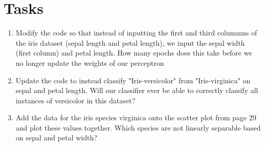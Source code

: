 \documentclass[12pt]{article}
\begin{document}
\section{Tasks}
\begin{enumerate}
\item Modify the code so that instead of inputting the first and third colummns of the iris dataset (sepal length and petal length), we input the sepal width (first column) and petal length. How many epochs does this take before we no longer update the weights of our perceptron 
\item Update the code to instead classify "Iris-versicolor" from "Iris-virginica" on sepal and petal length. Will our classifier ever be able to correctly classify all instances of versicolor in this dataset? 


\item Add the data for the iris species virginica onto the scatter plot from page 29 and plot these values together. Which species are not linearly  separable based on sepal and petal width?

\end{enumerate}
\end{document}
